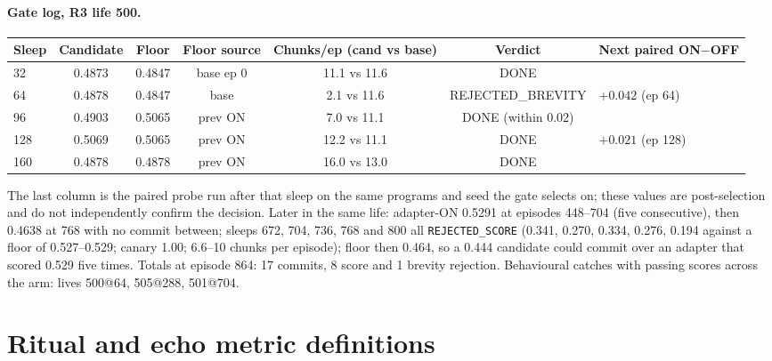 \documentclass{article}
\newcommand{\onoff}{ON$-$OFF}
\begin{document}
\paragraph{Gate log, R3 life 500.}
\begin{center}\small
\begin{tabular}{lcccccl}
\toprule
Sleep & Candidate & Floor & Floor source & Chunks/ep (cand vs base) & Verdict & Next paired \onoff{} \\
\midrule
32 & 0.4873 & 0.4847 & base ep 0 & 11.1 vs 11.6 & DONE & \\
64 & 0.4878 & 0.4847 & base & 2.1 vs 11.6 & REJECTED\_BREVITY & $+0.042$ (ep 64) \\
96 & 0.4903 & 0.5065 & prev ON & 7.0 vs 11.1 & DONE (within 0.02) & \\
128 & 0.5069 & 0.5065 & prev ON & 12.2 vs 11.1 & DONE & $+0.021$ (ep 128) \\
160 & 0.4878 & 0.4878 & prev ON & 16.0 vs 13.0 & DONE & \\
\bottomrule
\end{tabular}
\end{center}
The last column is the paired probe run after that sleep on the same programs and seed the gate selects on; these values are post-selection and do not independently confirm the decision. Later in the same life: adapter-ON 0.5291 at episodes 448--704 (five consecutive), then 0.4638 at 768 with no commit between; sleeps 672, 704, 736, 768 and 800 all \texttt{REJECTED\_SCORE} (0.341, 0.270, 0.334, 0.276, 0.194 against a floor of 0.527--0.529; canary 1.00; 6.6--10 chunks per episode); floor then 0.464, so a 0.444 candidate could commit over an adapter that scored 0.529 five times. Totals at episode 864: 17 commits, 8 score and 1 brevity rejection. Behavioural catches with passing scores across the arm: lives 500@64, 505@288, 501@704.

\section{Ritual and echo metric definitions}
\label{app:ritual}
\end{document}
